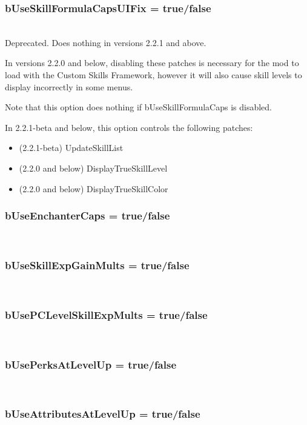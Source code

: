 \documentclass[12pt]{amsart}
\begin{document}
\startblock
\subsubsection{bUseSkillFormulaCapsUIFix = \textlangle true/false\textrangle}\hfill\\

Deprecated. Does nothing in versions 2.2.1 and above.

In versions 2.2.0 and below, disabling these patches is necessary for the mod to
load with the Custom Skills Framework, however it will also cause skill levels
to display incorrectly in some menus.

Note that this option does nothing if bUseSkillFormulaCaps is disabled.

In 2.2.1-beta and below, this option controls the following patches:
\begin{itemize}
    \item (2.2.1-beta) UpdateSkillList
    \item (2.2.0 and below) DisplayTrueSkillLevel
    \item (2.2.0 and below) DisplayTrueSkillColor
\end{itemize}
\stopblock

\startblock
\subsubsection{bUseEnchanterCaps = \textlangle true/false\textrangle}\hfill\\

\subsubsection{bUseSkillExpGainMults = \textlangle true/false\textrangle}\hfill\\

\subsubsection{bUsePCLevelSkillExpMults = \textlangle true/false\textrangle}\hfill\\

\subsubsection{bUsePerksAtLevelUp = \textlangle true/false\textrangle}\hfill\\

\subsubsection{bUseAttributesAtLevelUp = \textlangle true/false\textrangle}\hfill\\
\end{document}
